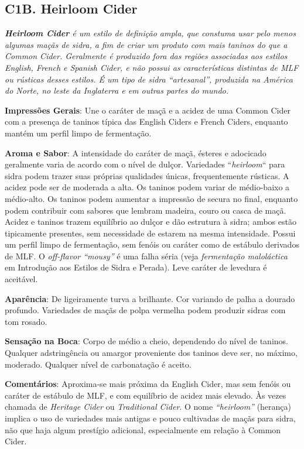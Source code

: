 \subsection*{C1B. Heirloom Cider}

\textit{\textbf{Heirloom Cider} é um estilo de definição ampla, que constuma usar pelo menos algumas maçãs de sidra, a fim de criar um produto com mais taninos do que a Common Cider. Geralmente é produzido fora das regiões associadas aos estilos English, French e Spanish Cider, e não possui as características distintas de MLF ou rústicas desses estilos. É um tipo de sidra “artesanal”, produzida na América do Norte, no leste da Inglaterra e em outras partes do mundo.}

\textbf{Impressões Gerais}: Une o caráter de maçã e a acidez de uma Common Cider com a presença de taninos típica das English Ciders e French Ciders, enquanto mantém um perfil limpo de fermentação.

\textbf{Aroma e Sabor}: A intensidade do caráter de maçã, ésteres e adocicado geralmente varia de acordo com o nível de dulçor. Variedades “\textit{heirloom}“ para sidra podem trazer suas próprias qualidades únicas, frequentemente rústicas. A acidez pode ser de moderada a alta. Os taninos podem variar de médio-baixo a médio-alto. Os taninos podem aumentar a impressão de secura no final, enquanto podem contribuir com sabores que lembram madeira, couro ou casca de maçã. Acidez e taninos trazem equilíbrio ao dulçor e dão estrutura à sidra; ambos estão tipicamente presentes, sem necessidade de estarem na mesma intensidade. Possui um perfil limpo de fermentação, sem fenóis ou caráter como de estábulo derivados de MLF. O \textit{off-flavor “mousy”} é uma falha séria (veja \textit{fermentação maloláctica} em Introdução aos Estilos de Sidra e Perada). Leve caráter de levedura é aceitável.

\textbf{Aparência}: De ligeiramente turva a brilhante. Cor variando de palha a dourado profundo. Variedades de maçãs de polpa vermelha podem produzir sidras com tom rosado.

\textbf{Sensação na Boca}: Corpo de médio a cheio, dependendo do nível de taninos. Qualquer adstringência ou amargor proveniente dos taninos deve ser, no máximo, moderado. Qualquer nível de carbonatação é aceito.

\textbf{Comentários}: Aproxima-se mais próxima da English Cider, mas sem fenóis ou caráter de estábulo de MLF, e com equilíbrio de acidez mais elevado. Às vezes chamada de \textit{Heritage Cider} ou \textit{Traditional Cider}. O nome \textit{“heirloom”} (herança) implica o uso de variedades mais antigas e pouco cultivadas de maçãs para sidra, não que haja algum prestígio adicional, especialmente em relação à Common Cider.

